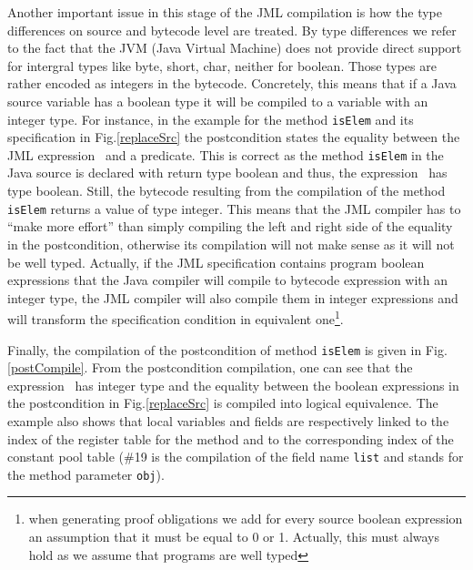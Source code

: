 \begin{enumerate}
Another important issue in this stage of the JML compilation is how the type differences on source and bytecode level are treated. 
By type differences we refer to the fact that the JVM (Java Virtual Machine) does not provide direct support for intergral types like byte, short, char, neither for boolean. Those types are rather encoded as integers in the bytecode. Concretely, this means that 
if a Java source variable has a boolean type it will be compiled to a variable with
an integer type. For instance, in the example for the method 
\texttt{isElem} and its specification in Fig.\ref{replaceSrc} the postcondition states the equality between the JML expression  
\result \ and a predicate. This is correct as the method \texttt{isElem} in the Java source is declared with return type boolean  and thus,
 the expression \result \ has type boolean. 
Still, the bytecode resulting from the compilation of the method  \texttt{isElem} returns a value of type integer. This means that the JML compiler has to 
``make more effort'' than simply compiling the left and right side of the equality in the postcondition, otherwise its compilation will not make sense as 
it will not be well typed. Actually, if the JML specification contains program boolean expressions that the Java compiler will compile to bytecode expression
 with an integer type, the JML compiler will also compile them in integer expressions and will transform the specification condition in equivalent 
one\footnote{when generating proof obligations we add for every source boolean expression an assumption that it
 must be equal to 0 or 1. Actually, this must always hold as we assume that programs are well typed}.  

Finally, the compilation of the postcondition of method \texttt{isElem} is given in Fig. \ref{postCompile}. From the postcondition compilation,
 one can see that the expression \result \ has integer type and the equality between the boolean expressions in the postcondition in Fig.\ref{replaceSrc} is
 compiled into logical equivalence. The example also 
shows that local variables and  fields are respectively linked to the index of the register table for the method and to the corresponding 
index of the constant pool table (\#19 is the compilation of the field name \texttt{list} and  stands for the method parameter \texttt{obj}). 


\end{enumerate}
